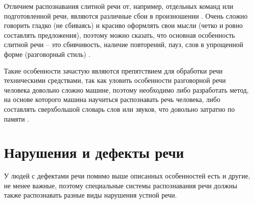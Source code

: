 Отличием распознавания слитной речи от, например, отдельных команд или подготовленной речи, являются различные сбои в произношении \cite{rechsb2} \cite{rechsb1}. Очень сложно говорить гладко (не сбиваясь) и красиво оформлять свои мысли (четко и ровно составлять предложения), поэтому можно сказать, что основная особенность слитной речи -- это сбивчивость, наличие повторений, пауз, слов в упрощенной форме (разговорный стиль) \cite{slitrech}. 

Такие особенности зачастую являются препятствием для обработки речи техническими средствами, так как уловить особенности разговорной речи человека довольно сложно машине, поэтому необходимо либо разработать метод, на основе которого машина научиться распознавать речь человека, либо составлять сверхбольшой словарь слов или звуков, что довольно затратно по памяти \cite{slitrech}.

\section{Нарушения и дефекты речи}
У людей с дефектами речи помимо выше описанных особенностей есть и другие, не менее важные, поэтому специальные системы распознавания речи должны также распознавать разные виды нарушения устной речи.



